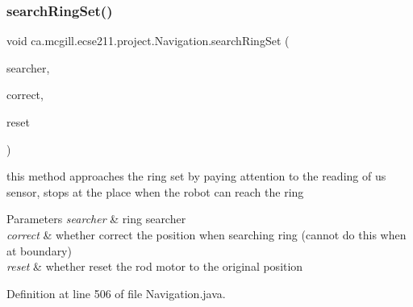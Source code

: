 \subsubsection{\texorpdfstring{search\+Ring\+Set()}{searchRingSet()}}
{\footnotesize\ttfamily void ca.\+mcgill.\+ecse211.\+project.\+Navigation.\+search\+Ring\+Set (\begin{DoxyParamCaption}\item[{\hyperlink{classca_1_1mcgill_1_1ecse211_1_1project_1_1_ring_searcher}{Ring\+Searcher}}]{searcher,  }\item[{boolean}]{correct,  }\item[{boolean}]{reset }\end{DoxyParamCaption})}


\begin{DoxyItemize}
\item this method approaches the ring set by paying attention to the reading of us sensor, stops at the place when the robot can reach the ring 
\begin{DoxyParams}{Parameters}
{\em searcher} & ring searcher \\
\hline
{\em correct} & whether correct the position when searching ring (cannot do this when at boundary) \\
\hline
{\em reset} & whether reset the rod motor to the original position \\
\hline
\end{DoxyParams}

\end{DoxyItemize}

Definition at line 506 of file Navigation.\+java.


